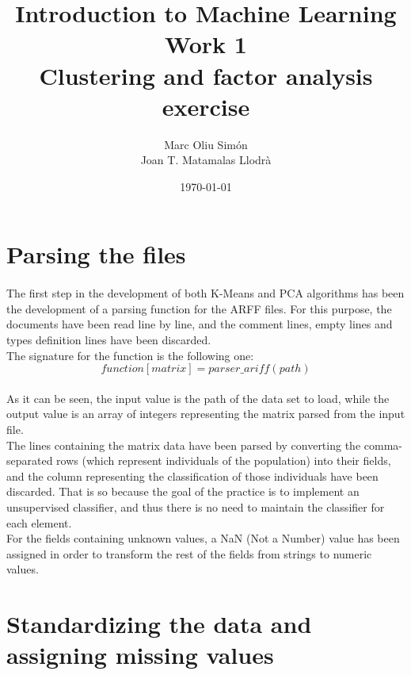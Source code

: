 \documentclass[12pt, a4paper]{article}
\title{Introduction to Machine Learning\\Work 1\\Clustering and factor analysis exercise}
\author{Marc Oliu Simón\\Joan T. Matamalas Llodrà}
\date{\today}
\begin{document}
\ifpdf
{}
\else
{}
\fi

\maketitle

\section{Parsing the files} %
\label{sec:parsing_the_files}
\paragraph{}The first step in the development of both K-Means and PCA algorithms has been the development of a parsing function for the ARFF files. For this purpose, the documents have been read line by line, and the comment lines, empty lines and types definition lines have been discarded.\\

The signature for the function is the following one:
\[
	function[matrix] = parser\_ariff(path)
\]
\paragraph{}As it can be seen, the input value is the path of the data set to load, while the output value is an array of integers representing the matrix parsed from the input file.\\

The lines containing the matrix data have been parsed by converting the comma-separated rows (which represent individuals of the population) into their fields, and the column representing the classification of those individuals have been discarded. That is so because the goal of the practice is to implement an unsupervised classifier, and thus there is no need to maintain the classifier for each element.\\

For the fields containing unknown values, a NaN (Not a Number) value has been assigned in order to transform the rest of the fields from strings to numeric values.

\section{Standardizing the data and assigning missing values} %
\label{sec:standardizing_the_data_and_assigning_missing_values}
\end{document}
